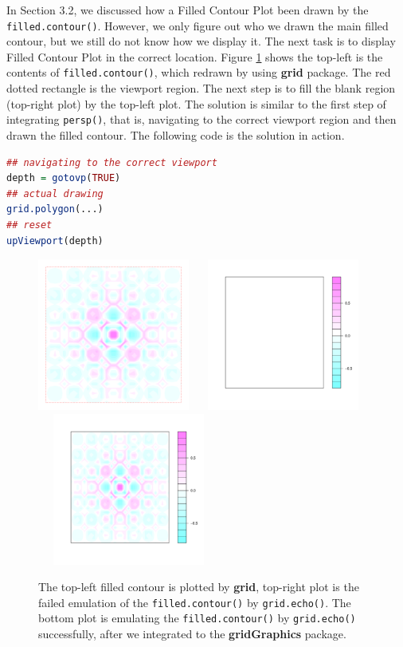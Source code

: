 \documentclass[11pt,twoside]{report}
\begin{document}
In Section 3.2, we discussed how a Filled Contour Plot been drawn by the \texttt{filled.contour()}. However, we only figure out who we drawn the main filled contour, but we still do not know how we display it. The next task is to display Filled Contour Plot in the correct location. Figure \ref{figure_4.6} shows the top-left is the contents of \texttt{filled.contour()}, which redrawn by using \textbf{grid} package. The red dotted rectangle is the viewport region. The next step is to fill the blank region (top-right plot) by the top-left plot. The solution is similar to the first step of integrating \texttt{persp()}, that is, navigating to the correct viewport region and then drawn the filled contour. The following code is the solution in action.
\begin{lstlisting}[language = R]
## navigating to the correct viewport
depth = gotovp(TRUE)
## actual drawing
grid.polygon(...)
## reset
upViewport(depth)
\end{lstlisting}
\begin{figure}[h]
	\begin{center}
		\includegraphics[height = 5cm, width = 5cm]{figure/filledContour_origin_02.pdf}
		\includegraphics[height = 5cm, width = 6cm]{figure/filledContour_origin_03.pdf}
		\includegraphics[height = 5cm, width = 6cm]{figure/filledContour_origin_01.pdf}
		\caption{The top-left filled contour is plotted by \textbf{grid}, top-right plot is the failed emulation of the \texttt{filled.contour()} by \texttt{grid.echo()}. The bottom plot is emulating the \texttt{filled.contour()} by \texttt{grid.echo()} successfully, after we integrated to the \textbf{gridGraphics} package.}
		\label{figure_4.6}
	\end{center}
\end{figure}
\end{document}
